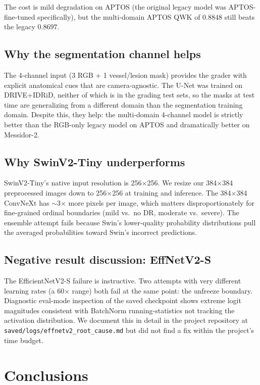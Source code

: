 \documentclass[11pt,a4paper]{article}
\begin{document}
The cost is mild degradation on APTOS (the original legacy model was APTOS-fine-tuned specifically), but the multi-domain APTOS QWK of $0.8848$ still beats the legacy $0.8697$.

\subsection{Why the segmentation channel helps}

The 4-channel input (3 RGB + 1 vessel/lesion mask) provides the grader with explicit anatomical cues that are camera-agnostic. The U-Net was trained on DRIVE+IDRiD, neither of which is in the grading test sets, so the masks at test time are generalizing from a different domain than the segmentation training domain. Despite this, they help: the multi-domain 4-channel model is strictly better than the RGB-only legacy model on APTOS and dramatically better on Messidor-2.

\subsection{Why SwinV2-Tiny underperforms}

SwinV2-Tiny's native input resolution is 256$\times$256. We resize our 384$\times$384 preprocessed images down to 256$\times$256 at training and inference. The 384$\times$384 ConvNeXt has $\sim$3$\times$ more pixels per image, which matters disproportionately for fine-grained ordinal boundaries (mild vs.\ no DR, moderate vs.\ severe). The ensemble attempt fails because Swin's lower-quality probability distributions pull the averaged probabilities toward Swin's incorrect predictions.

\subsection{Negative result discussion: EffNetV2-S}

The EfficientNetV2-S failure is instructive. Two attempts with very different learning rates (a 60$\times$ range) both fail at the same point: the unfreeze boundary. Diagnostic eval-mode inspection of the saved checkpoint shows extreme logit magnitudes consistent with BatchNorm running-statistics not tracking the activation distribution. We document this in detail in the project repository at \texttt{saved/logs/effnetv2\_root\_cause.md} but did not find a fix within the project's time budget.

\section{Conclusions}
\end{document}
